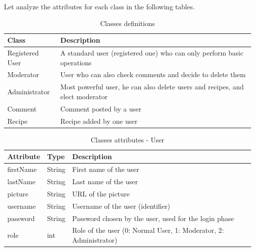 \documentclass[a4paper]{report}
\begin{document}
Let analyze the attributes for each class in the following tables.

\begin{table}[htpb]
\caption{Classes definitions}
\centering 
\begin{tabular}{|l|l|}
\hline
\rowcolor[HTML]{000000} 
{\color[HTML]{FFFFFF} Class} & {\color[HTML]{FFFFFF} Description}                                            \\ \hline
Registered User              & A standard user (registered one) who can only perform basic operations        \\ \hline
Moderator                    & User who can also check comments and decide to delete them                    \\ \hline
Administrator                & Most powerful user, he can also delete users and recipes, and elect moderator \\ \hline
Comment                      & Comment posted by a user                                                      \\ \hline
Recipe                       & Recipe added by one user                                                      \\ \hline
\end{tabular}
\end{table}

\begin{table}[htpb]
\caption{Classes attributes - User}
\centering 
\begin{tabular}{|l|l|l|}
\hline
\rowcolor[HTML]{000000} 
{\color[HTML]{FFFFFF} Attribute} & {\color[HTML]{FFFFFF} Type} & {\color[HTML]{FFFFFF} Description}                                \\ \hline
firstName                        & String                      & First name of the user                                            \\ \hline
lastName                         & String                      & Last name of the user                                             \\ \hline
picture                          & String                      & URL of the picture                                                \\ \hline
username                         & String                      & Username of the user (identifier)                                 \\ \hline
password                         & String                      & Password chosen by the user, used for the login phase             \\ \hline
role                             & int                         & Role of the user (0: Normal User, 1: Moderator, 2: Administrator) \\ \hline
\end{tabular}
\end{table}
\end{document}
